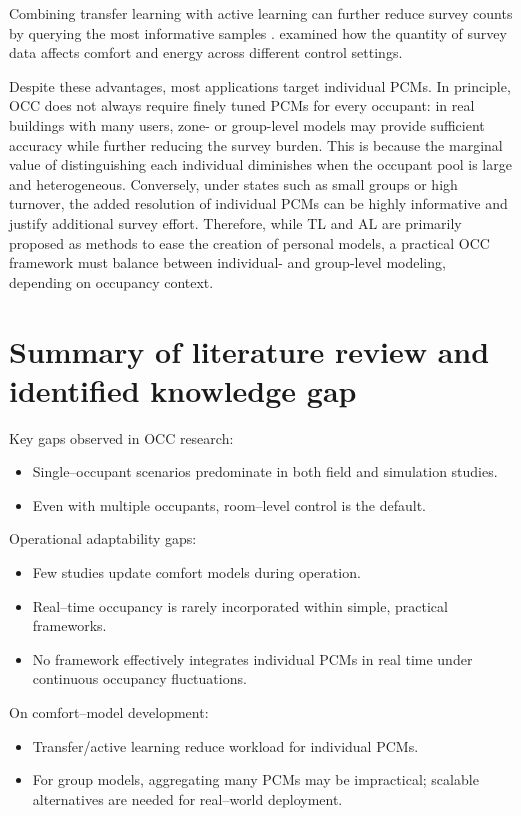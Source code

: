 Combining transfer learning with active learning can further reduce survey counts by querying the most informative samples \cite{tekler_data-efficient_2024}.
\cite{horikoshi_developing_2024} examined how the quantity of survey data affects comfort and energy across different control settings.

Despite these advantages, most applications target individual PCMs.  
In principle, OCC does not always require finely tuned PCMs for every occupant: in real buildings with many users, zone- or group-level models may provide sufficient accuracy while further reducing the survey burden.
This is because the marginal value of distinguishing each individual diminishes when the occupant pool is large and heterogeneous\cite{jung_energy_2020}.
Conversely, under states such as small groups or high turnover, the added resolution of individual PCMs can be highly informative and justify additional survey effort.
Therefore, while TL and AL are primarily proposed as methods to ease the creation of personal models, a practical OCC framework must balance between individual- and group-level modeling, depending on occupancy context.

\section{Summary of literature review and identified knowledge gap}

Key gaps observed in OCC research:
\begin{itemize}
  \setlength{\itemsep}{0pt}\setlength{\parskip}{0pt}
  \item Single–occupant scenarios predominate in both field and simulation studies. 
  \item Even with multiple occupants, room–level control is the default.
\end{itemize}

Operational adaptability gaps:
\begin{itemize}
  \setlength{\itemsep}{0pt}\setlength{\parskip}{0pt}
  \item Few studies update comfort models during operation. 
  \item Real–time occupancy is rarely incorporated within simple, practical frameworks.
  \item No framework effectively integrates individual PCMs in real time under continuous occupancy fluctuations.
\end{itemize}

On comfort–model development:
\begin{itemize}
  \setlength{\itemsep}{0pt}\setlength{\parskip}{0pt}
  \item Transfer/active learning reduce workload for individual PCMs. 
  \item For group models, aggregating many PCMs may be impractical; scalable alternatives are needed for real–world deployment.
\end{itemize}

